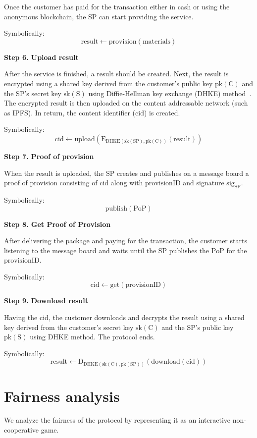 \documentclass[pdftex,twocolumn,epjc3]{svjour3}
\begin{document}
{Once the customer has paid for the transaction either in cash or using the anonymous blockchain, the SP can start providing the service.

Symbolically: 
\[
\mathrm{result \gets provision(materials)}
\]

\noindent \textbf
{Step 6. Upload result}\label{step-6-upload-result}

After the service is finished, a result should be created. 
Next, the result is encrypted using a shared key derived from the customer's public key $\mathrm{pk(C)}$ and the SP's secret key $\mathrm{sk(S)}$ using Diffie-Hellman key exchange (DHKE) method~\cite{diffieNewDirectionsCryptography1976}.
The encrypted result is then uploaded on the content addressable network (such as IPFS). In return, the content identifier ($\mathrm{cid}$) is created.

Symbolically: 
\[
\mathrm{cid \gets upload(E_{DHKE(sk(SP), pk(C))}(result))}
\]

\noindent \textbf
{Step 7. Proof of provision}\label{step-7-proof-of-provision}

When the $\mathrm{result}$ is uploaded, the SP creates and publishes on a message board a proof of provision consisting of $\mathrm{cid}$ along with $\mathrm{provisionID}$ and signature $\mathrm{sig}_\mathrm{SP}$.

Symbolically: 
\[
\mathrm{publish(PoP)}
\]

\noindent \textbf
{Step 8. Get Proof of Provision}\label{step-8-get-proof-of-provision}

After delivering the package and paying for the transaction, the customer starts listening to the message board and waits until the SP publishes the $\mathrm{PoP}$ for the $\mathrm{provisionID}$.

Symbolically: 
\[
\mathrm{cid \gets get(provisionID)}
\]

\noindent \textbf
{Step 9. Download result}\label{step-9-download-result}

Having the $\mathrm{cid}$, the customer downloads and decrypts the $\mathrm{result}$ using a shared key derived from the customer's secret key $\mathrm{sk(C)}$ and the SP's public key $\mathrm{pk(S)}$ using DHKE method. The protocol ends.

Symbolically: 
\[
\mathrm{result \gets D_{DHKE(sk(C), pk(SP))}(download(cid))}
\]

\section{Fairness analysis}\label{sec:fairness-analysis}
We analyze the fairness of the protocol by representing it as an interactive non-cooperative game.

}
\end{document}
